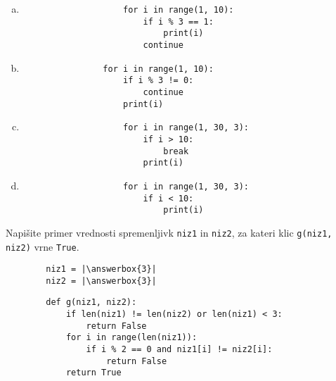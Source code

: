 \documentclass[arhiv, 10pt]{../izpit}
\newcommand{\inlinepy}[1]{\texttt{#1}}
\newcommand{\answerbox}[1]{\framebox{\vphantom{\large M}\hspace{#1cm}}}
\begin{document}
        \begin{multicols}{2}
        \begin{enumerate}[(a)]
\item 
                \begin{verbatim}
                    for i in range(1, 10):
                        if i % 3 == 1:
                            print(i)
                        continue
                \end{verbatim}
            
\item 
            \begin{verbatim}
                for i in range(1, 10):
                    if i % 3 != 0:
                        continue
                    print(i)
            \end{verbatim}
        
\item 
                \begin{verbatim}
                    for i in range(1, 30, 3):
                        if i > 10:
                            break
                        print(i)
                \end{verbatim}
            
\item 
                \begin{verbatim}
                    for i in range(1, 30, 3):
                        if i < 10:
                            print(i)
                \end{verbatim}
            
\end{enumerate}

        \end{multicols}
    
        \naloga*
        \begin{multicols}{2}
        \noindent
        Napišite primer vrednosti spremenljivk \inlinepy{niz1} in \inlinepy{niz2}, za kateri klic \inlinepy{g(niz1, niz2)} vrne \inlinepy{True}.
        \begin{verbatim}
        niz1 = |\answerbox{3}|
        niz2 = |\answerbox{3}|
        \end{verbatim}
        \vfil
        \columnbreak
        \begin{verbatim}
        def g(niz1, niz2):
            if len(niz1) != len(niz2) or len(niz1) < 3:
                return False
            for i in range(len(niz1)):
                if i % 2 == 0 and niz1[i] != niz2[i]:
                    return False
            return True
        \end{verbatim}
        \end{multicols}
    
\end{document}
